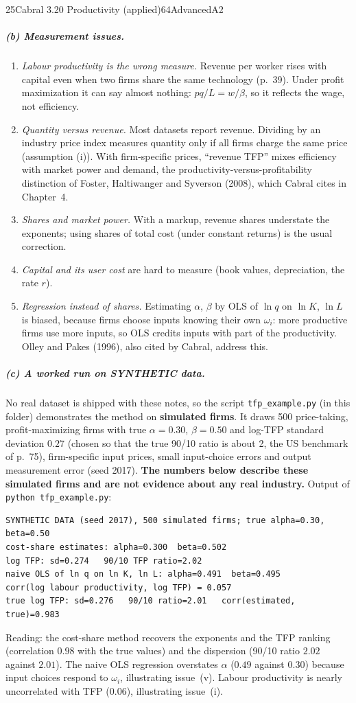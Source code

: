 \begin{exsol}{25}{Cabral 3.20 Productivity (applied)}{64}{Advanced}{A2}
\subparagraph{(b) Measurement issues.}
\begin{enumerate}[label=(\roman*)]
  \item \emph{Labour productivity is the wrong measure.} Revenue per worker rises with capital
  even when two firms share the same technology (p.~39). Under profit maximization it can say
  almost nothing: $pq/L = w/\beta$, so it reflects the wage, not efficiency.
  \item \emph{Quantity versus revenue.} Most datasets report revenue. Dividing by an industry
  price index measures quantity only if all firms charge the same price (assumption (i)). With
  firm-specific prices, ``revenue TFP'' mixes efficiency with market power and demand, the
  productivity-versus-profitability distinction of Foster, Haltiwanger and Syverson (2008), which
  Cabral cites in Chapter~4.
  \item \emph{Shares and market power.} With a markup, revenue shares understate the exponents;
  using shares of total cost (under constant returns) is the usual correction.
  \item \emph{Capital and its user cost} are hard to measure (book values, depreciation, the
  rate $r$).
  \item \emph{Regression instead of shares.} Estimating $\alpha$, $\beta$ by OLS of $\ln q$ on
  $\ln K$, $\ln L$ is biased, because firms choose inputs knowing their own $\omega_i$: more
  productive firms use more inputs, so OLS credits inputs with part of the productivity. Olley
  and Pakes (1996), also cited by Cabral, address this.
\end{enumerate}

\subparagraph{(c) A worked run on SYNTHETIC data.} No real dataset is shipped with these notes,
so the script \texttt{tfp\_example.py} (in this folder) demonstrates the method on
\textbf{simulated firms}. It draws 500 price-taking, profit-maximizing firms with true
$\alpha = 0.30$, $\beta = 0.50$ and log-TFP standard deviation $0.27$ (chosen so that the true
90/10 ratio is about 2, the US benchmark of p.~75), firm-specific input prices, small
input-choice errors and output measurement error (seed 2017). \textbf{The numbers below describe
these simulated firms and are not evidence about any real industry.} Output of
\texttt{python tfp\_example.py}:
{\small
\begin{verbatim}
SYNTHETIC DATA (seed 2017), 500 simulated firms; true alpha=0.30, beta=0.50
cost-share estimates: alpha=0.300  beta=0.502
log TFP: sd=0.274   90/10 TFP ratio=2.02
naive OLS of ln q on ln K, ln L: alpha=0.491  beta=0.495
corr(log labour productivity, log TFP) = 0.057
true log TFP: sd=0.276   90/10 ratio=2.01   corr(estimated, true)=0.983
\end{verbatim}
}
Reading: the cost-share method recovers the exponents and the TFP ranking (correlation $0.98$
with the true values) and the dispersion (90/10 ratio $2.02$ against $2.01$). The naive OLS
regression overstates $\alpha$ ($0.49$ against $0.30$) because input choices respond to
$\omega_i$, illustrating issue~(v). Labour productivity is nearly uncorrelated with TFP
($0.06$), illustrating issue~(i).


\end{exsol}
